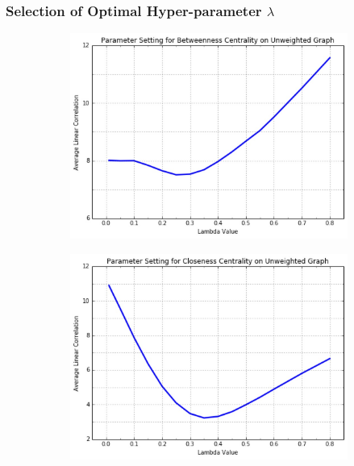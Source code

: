 \documentclass[9pt]{beamer}
\begin{document}
\begin{frame}
\frametitle{Selection of Optimal Hyper-parameter $\lambda$}
\vspace{0.15in}
\begin{figure}[H]
\centering
\begin{subfigure}{.4\textwidth}
  \centering
  \includegraphics[width=0.95\linewidth]{BCU_2.jpeg}
\end{subfigure}
\begin{subfigure}{.4\textwidth}
	\centering
    \includegraphics[width=0.95\linewidth]{CCU_2.jpeg}
\end{subfigure}


\end{figure}
\end{frame}
\end{document}
